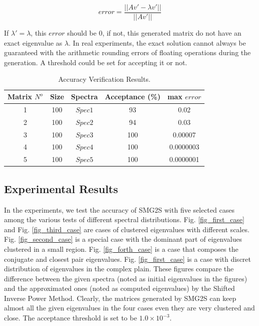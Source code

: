 \begin{equation}
\label{check}
error=
\frac{||Av'-\lambda v'||}{||Av'||}
\end{equation}

If $\lambda' = \lambda$, this $error$ should be $0$, if not, this generated matrix do not have an exact eigenvalue as $\lambda$. In real experiments, the exact solution cannot always be guaranteed with the arithmetic rounding errors of floating operations during the generation. A threshold could be set for accepting it or not.

\begin{table}[htbp]
	\renewcommand{\arraystretch}{1.4}
	\small	
	\caption{Accuracy Verification Results.}
	\label{accuracy}
	\centering
	\begin{tabular}{c|c|c|c|c}
		\toprule
		\cellcolor{gray!50}Matrix $N^{o}$& \cellcolor{gray!50}Size & \cellcolor{gray!50}Spectra & \cellcolor{gray!50}Acceptance (\%) & \cellcolor{gray!50}max $error$ \\
		\midrule
		1  & 100 & $Spec1$ &93&\num[round-precision=2,round-mode=figures]{0.02}\\
		\cellcolor{gray!20}2 & \cellcolor{gray!20}100 & \cellcolor{gray!20}$Spec2$   & \cellcolor{gray!20}94&\cellcolor{gray!20}\num[round-precision=2,round-mode=figures]{0.03}\\
		3 & 100 & $Spec3$  &100&\num[round-precision=2,round-mode=figures]{0.00007}\\
		\cellcolor{gray!20}4 & \cellcolor{gray!20}100 & \cellcolor{gray!20}$Spec4$  &\cellcolor{gray!20}100&\cellcolor{gray!20}\num[round-precision=2,round-mode=figures]{0.0000003}\\
		5 & 100 & $Spec5$  &100&\num[round-precision=2,round-mode=figures]{0.0000001}\\
		\bottomrule
	\end{tabular}
\end{table}

\subsection{Experimental Results}

In the experiments, we test the accuracy of SMG2S with five selected cases among the various tests of different spectral distributions. Fig. \ref{fig_first_case} and Fig. \ref{fig_third_case} are cases of clustered eigenvalues with different scales. Fig. \ref{fig_second_case} is a special case with the dominant part of eigenvalues clustered in a small region. Fig. \ref{fig_forth_case} is a case that composes the conjugate and closest pair eigenvalues. Fig. \ref{fig_first_case} is a case with discret distribution of eigenvalues in the complex plain. These figures compare the difference between the given spectra (noted as initial eigenvalues in the figures) and the approximated ones (noted as computed eigenvalues) by the Shifted Inverse Power Method. Clearly, the matrices generated by SMG2S can keep almost all the given eigenvalues in the four cases even they are very clustered and close. The acceptance threshold is set to be $1.0\times 10^{-3}$.


